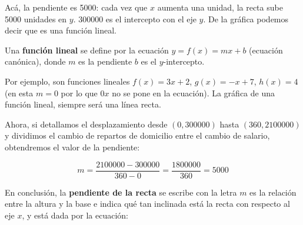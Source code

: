 \documentclass[12pt,a4paper]{article}
\begin{document}
\begin{center}
\end{center}

\vspace{1cm}

Acá, la pendiente es 5000: cada vez que $x$ aumenta una unidad, la recta sube 5000 unidades en $y$. 300000 es el intercepto con el eje $y$. De la gráfica podemos decir que es una función lineal.

Una \textbf{función lineal} se define por la ecuación $y = f(x) = mx + b$ (ecuación canónica), donde $m$ es la pendiente $b$ es el $y$-intercepto.

Por ejemplo, son funciones lineales $f(x) = 3x + 2$, $g(x) = -x + 7$, $h(x) = 4$ (en esta $m = 0$ por lo que $0x$ no se pone en la ecuación). La gráfica de una función lineal, siempre será una línea recta.

\vspace{0.5cm}

Ahora, si detallamos el desplazamiento desde $(0, 300000)$ hasta $(360, 2100000)$ y dividimos el cambio de repartos de domicilio entre el cambio de salario, obtendremos el valor de la pendiente:

$$m = \frac{2100000 - 300000}{360 - 0} = \frac{1800000}{360} = 5000$$

En conclusión, la \textbf{pendiente de la recta} se escribe con la letra $m$ es la relación entre la altura y la base e indica qué tan inclinada está la recta con respecto al eje $x$, y está dada por la ecuación:
\end{document}
